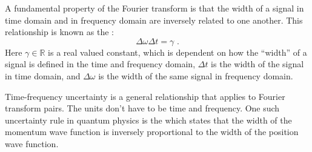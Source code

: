 A fundamental property of the Fourier transform is that the width of a
signal in time domain and in frequency domain are inversely related to
one another. This relationship is known as
the \emph{}:
\begin{equation}
  \boxed{
  \Delta \omega \Delta t = \gamma 
    } \,\,.
     \label{eq:uncertainty}
\end{equation}
Here $\gamma \in \mathbb{R}$ is a real valued constant, which is
dependent on how the ``width'' of a signal is defined in the time and
frequency domain, $\Delta t$ is the width of the signal in
time domain, and $\Delta \omega$ is the width of the same signal in
frequency domain.

Time-frequency uncertainty is a general relationship that applies to
Fourier transform pairs. The units don't have to be time and frequency. One such uncertainty rule in quantum physics is
the \emph{} which states that the width of the momentum
wave function is inversely proportional to the width of the position
wave function.

